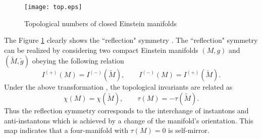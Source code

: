 \documentclass[12pt,epsf]{article}
\begin{document}
\begin{figure}
\centering
\texttt{[image: top.eps]}
\caption{Topological numbers of closed Einstein manifolds}
\label{top-numbers}
\end{figure}



The Figure \ref{top-numbers} clearly shows the ``reflection" symmetry \cite{pos-yang}.
The ``reflection" symmetry can be realized by considering two compact Einstein manifolds $(M, g)$
and $(\widetilde{M}, \widetilde{g})$ obeying the following relation
\begin{equation}\label{ref-symm}
  I^{(+)} (M)  = I^{(-)} (\widetilde{M}), \qquad  I^{(-)} (M)  = I^{(+)} (\widetilde{M}).
\end{equation}
Under the above transformation , the topological invariants are related as
\begin{equation}\label{ref-top}
  \chi(M) = \chi(\widetilde{M}), \qquad \tau(M) = - \tau(\widetilde{M}).
\end{equation}
Thus the reflection symmetry corresponds to the interchange of instantons and anti-instantons
which is achieved by a change of the manifold's orientation.
This map indicates that a four-manifold with $\tau(M) = 0$ is self-mirror.
\end{document}

